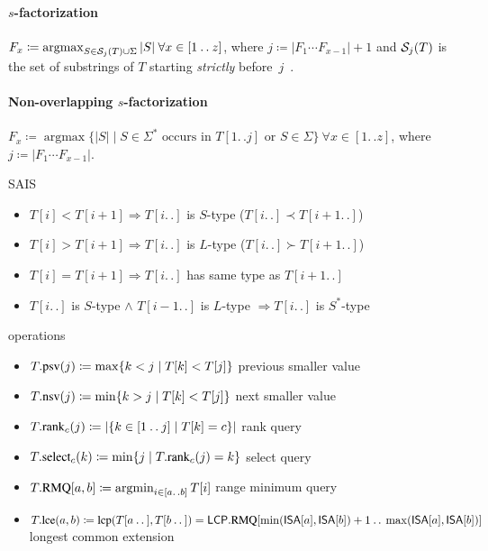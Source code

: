 \documentclass[10pt,landscape]{article}
\newcommand*{\IC}{\mathbin{{.}\,{.}}} %
\newcommand*{\abs}[1]{\ensuremath{|#1|}} %
\newcommand*{\menge}[1]{\ensuremath{\{#1\}}} %
\newcommand*{\instancename}[1]{\ensuremath{\mathsf{#1}}} %
\newcommand*{\LCPA} {\instancename{LCP}}
\newcommand*{\ISA} {\instancename{ISA}}
\newcommand*{\textT}  {\ensuremath{T}}
\newcommand*{\functionname}[1]{{\ensuremath{\renewcommand{\rmdefault}{ptm}\fontfamily{ppl}\selectfont\textrm{\textup{#1}}}}} %
\newcommand*{\select}{\functionname{select}}
\newcommand*{\rank}{\functionname{rank}}
\newcommand*{\RMQ}{\functionname{RMQ}}
\newcommand*{\lcp}{\functionname{lcp}}
\newcommand*{\lce}{\functionname{lce}}
\newcommand*{\psv}{\functionname{psv}}
\newcommand*{\nsv}{\functionname{nsv}}
\newcommand*{\argmax}{\operatorname{argmax}}
\newcommand*{\argmin}{\operatorname{argmin}}
\begin{document}
\begin{multicols}{2}
\paragraph{$s$-factorization}
$F_x \coloneqq \argmax_{S \in \SubStrPrev{j}{T} \cup \Sigma} \abs{S}~\forall x \in [1\IC{} z]$, where $j \coloneqq \abs{F_1\cdots F_{x-1}}+1$
and $\SubStrPrev{j}{\textT}$ is the set of substrings of $\textT$ starting \emph{strictly} before~$j$~\cite{storer82lzss}.

\paragraph{Non-overlapping $s$-factorization}
$F_x \coloneqq \argmax \menge{ \abs{S} \mid S \in \Sigma^* \text{~occurs in~} T[1\IC{}j] \text{~or~} S \in \Sigma}~\forall
x \in [1\IC{}z]$, where $j \coloneqq \abs{F_1\cdots F_{x-1}}$.



SAIS
	\begin{itemize}
	   \item $\textT[i] < \textT[i+1] \Rightarrow \textT[i\IC{}]$ is $S$-type ($\textT[i\IC{}] \prec \textT[i+1\IC{}]$)
	   \item $\textT[i] > \textT[i+1] \Rightarrow \textT[i\IC{}]$ is $L$-type ($\textT[i\IC{}] \succ \textT[i+1\IC{}]$)
	   \item $\textT[i] = \textT[i+1] \Rightarrow \textT[i\IC{}]$ has same type as $\textT[i+1\IC{}]$
	   \item $\textT[i\IC{}]$ is $S$-type $\wedge$ $\textT[i-1\IC{}]$ is $L$-type $\Rightarrow \textT[i\IC{}]$ is $S^*$-type
	\end{itemize}

operations
	\begin{itemize}
	   \item $\textT.\psv(j) \coloneqq \max \{ k < j \mid \textT[k] < \textT[j] \}$ previous smaller value
	   \item $\textT.\nsv(j) \coloneqq \min \{ k > j \mid \textT[k] < \textT[j] \}$ next smaller value
	   \item $\textT.\rank_c(j) \coloneqq \abs{\menge{ k \in [1\IC{}j] \mid \textT[k] = c } }$ rank query
	   \item $\textT.\select_c(k) \coloneqq \min \menge{j \mid \textT.\rank_c(j) = k}$ select query
	   \item $\textT.\RMQ[a,b] \coloneqq \argmin_{i \in [a\IC{}b]} T[i]$ range minimum query
	   \item $\textT.\lce(a,b) \coloneqq \lcp(T[a\IC{}],T[b\IC{}]) = \LCPA.\RMQ[\min(\ISA[a],\ISA[b])+1\IC{}\max(\ISA[a],\ISA[b])]$ longest common extension
	\end{itemize}




\end{multicols}
\end{document}
